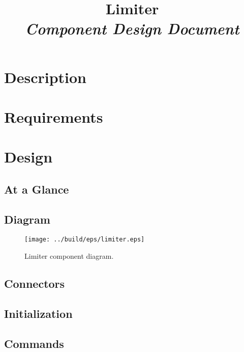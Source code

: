



\title{\textbf{Limiter} \\
\large\textit{Component Design Document}}
\date{}
\maketitle

\section{Description}


\section{Requirements}


\section{Design}

\subsection{At a Glance}


\subsection{Diagram}
\begin{figure}[H]
  \texttt{[image: ../build/eps/limiter.eps]}
  \caption{Limiter component diagram.}
\end{figure}

\subsection{Connectors}


\subsection{Initialization}


\subsection{Commands}

